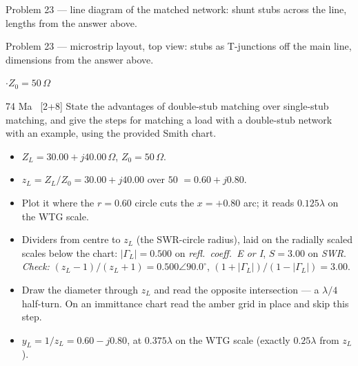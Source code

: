 {\footnotesize\color{sub} Problem 23 --- line diagram of the matched network: shunt stubs across the line, lengths from the answer above.}

{\footnotesize\color{sub} Problem 23 --- microstrip layout, top view: stubs as T-junctions off the main line, dimensions from the answer above.}

\vspace{2pt}

{\color{sub}\footnotesize {} \gap$\cdot$\gap $Z_0 = 50\,\Omega$}

\begin{asked}{74 Ma \ [2+8]}
State the advantages of double-stub matching over single-stub matching, and give the steps for matching a load with a double-stub network with an example, using the provided Smith chart.
\end{asked}
\begin{itemize}
  \item $Z_L = 30.00 + j40.00\,\Omega$, $Z_0 = 50\,\Omega$.
\end{itemize}
\begin{itemize}
  \item $z_L = Z_L/Z_0 = 30.00 + j40.00$ over $50$ $=0.60 + j0.80$.
  \item Plot it where the $r = 0.60$ circle cuts the $x = +0.80$ arc; it reads $0.125\lambda$ on the WTG scale.
  \item Dividers from centre to $z_L$ (the SWR-circle radius), laid on the radially scaled scales below the chart: $|\Gamma_L| = 0.500$ on \emph{refl.\ coeff.\ E or I}, $S = 3.00$ on \emph{SWR}. \textit{Check:} $(z_L-1)/(z_L+1) = 0.500\angle 90.0^\circ$, $(1+|\Gamma_L|)/(1-|\Gamma_L|) = 3.00$.
\end{itemize}
\begin{itemize}
  \item Draw the diameter through $z_L$ and read the opposite intersection --- a $\lambda/4$ half-turn. On an immittance chart read the amber grid in place and skip this step.
  \item $y_L = 1/z_L = 0.60 - j0.80$, at $0.375\lambda$ on the WTG scale (exactly $0.25\lambda$ from $z_L$).
\end{itemize}
